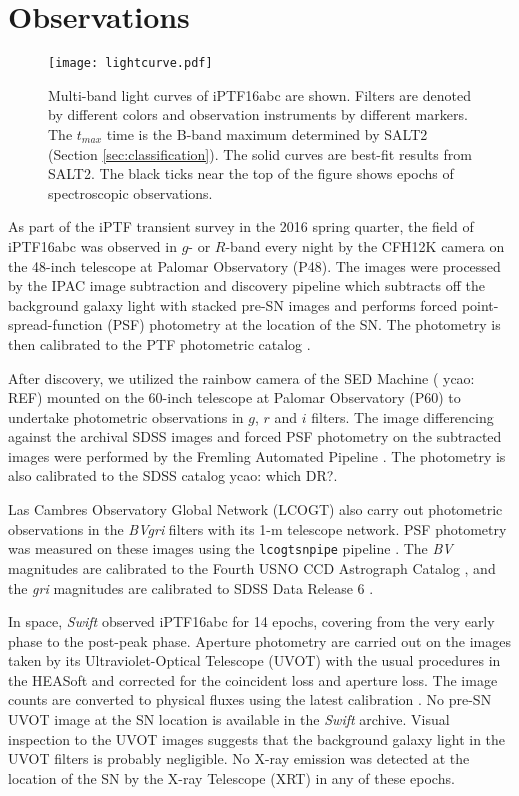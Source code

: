 \documentclass[twocolumn]{aastex61}
\newcommand{\ycao}[1]{{\color{red} ycao: {#1}}}
\begin{document}
\section{Observations}
\label{sec:obs}

\begin{figure*}[htb]
  \centering
  \texttt{[image: lightcurve.pdf]}
  \caption{Multi-band light curves of iPTF16abc are shown. Filters are
    denoted by different colors and observation instruments by
    different markers. The $t_{max}$ time is the B-band maximum
    determined by SALT2 (Section \ref{sec:classification}). The solid
    curves are best-fit results from SALT2. The black ticks near the
    top of the figure shows epochs of spectroscopic observations.}
  \label{fig:lightcurve}
\end{figure*}

As part of the iPTF transient survey in the 2016 spring quarter, the
field of iPTF16abc was observed in $g$- or $R$-band every night by the
CFH12K camera \citep{2000SPIE.3965...58S} on the 48-inch telescope at
Palomar Observatory (P48). The images were processed by the IPAC image
subtraction and discovery pipeline which subtracts off the background
galaxy light with stacked pre-SN images and performs forced
point-spread-function (PSF) photometry at the location of the SN. The
photometry is then calibrated to the PTF photometric catalog
\citep{2012PASP..124..854O}.

After discovery, we utilized the rainbow camera of the SED Machine
(\ycao{REF}) mounted on the 60-inch telescope at Palomar Observatory
(P60) to undertake photometric observations in $g$, $r$ and $i$
filters. The image differencing against the archival SDSS images and
forced PSF photometry on the subtracted images were performed by the
Fremling Automated Pipeline \citep{2016A&A...593A..68F}. The
photometry is also calibrated to the SDSS catalog \ycao{which DR?}.

Las Cambres Observatory Global Network (LCOGT) also carry out
photometric observations in the \textit{BVgri} filters with its 1-m
telescope network.  PSF photometry was measured on these images using
the \texttt{lcogtsnpipe} pipeline \citep{2016MNRAS.459.3939V}. The
\textit{BV} magnitudes are calibrated to the Fourth USNO CCD
Astrograph Catalog \citep{2013AJ....145...44Z}, and the \textit{gri}
magnitudes are calibrated to SDSS Data Release 6
\citep{2008ApJS..175..297A}.

In space, \textit{Swift} observed iPTF16abc for 14 epochs, covering
from the very early phase to the post-peak phase. Aperture photometry
are carried out on the images taken by its Ultraviolet-Optical
Telescope (UVOT) with the usual procedures in the HEASoft and
corrected for the coincident loss and aperture loss. The image counts
are converted to physical fluxes using the latest calibration
\citep{2011AIPC.1358..373B}. No pre-SN UVOT image at the SN location
is available in the \textit{Swift} archive.  Visual inspection to the
UVOT images suggests that the background galaxy light in the UVOT
filters is probably negligible. No X-ray emission was detected at the
location of the SN by the X-ray Telescope (XRT) in any of these
epochs.
\end{document}

